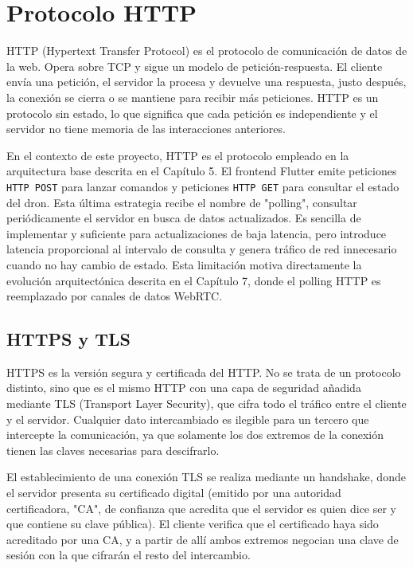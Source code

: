 \section{Protocolo HTTP}
HTTP (Hypertext Transfer Protocol)\cite{http} es el protocolo de comunicación de datos de la web. Opera sobre TCP y sigue un modelo de petición-respuesta. El cliente envía una petición, el servidor la procesa y devuelve una respuesta, justo después, la conexión se cierra o se mantiene para recibir más peticiones. HTTP es un protocolo sin estado, lo que significa que cada petición es independiente y el servidor no tiene memoria de las interacciones anteriores.

En el contexto de este proyecto, HTTP es el protocolo empleado en la arquitectura base descrita en el Capítulo 5. El frontend Flutter emite peticiones \texttt{HTTP POST} para lanzar comandos y peticiones \texttt{HTTP GET} para consultar el estado del dron. Esta última estrategia recibe el nombre de "polling", consultar periódicamente el servidor en busca de datos actualizados. Es sencilla de implementar y suficiente para actualizaciones de baja latencia, pero introduce latencia proporcional al intervalo de consulta y genera tráfico de red innecesario cuando no hay cambio de estado. Esta limitación motiva directamente la evolución arquitectónica descrita en el Capítulo 7, donde el polling HTTP es reemplazado por canales de datos WebRTC.

\subsection{HTTPS y TLS}
HTTPS es la versión segura y certificada del HTTP. No se trata de un protocolo distinto, sino que es el mismo HTTP con una capa de seguridad añadida mediante TLS (Transport Layer Security)\cite{tls}, que cifra todo el tráfico entre el cliente y el servidor. Cualquier dato intercambiado es ilegible para un tercero que intercepte la comunicación, ya que solamente los dos extremos de la conexión tienen las claves necesarias para descifrarlo.

El establecimiento de una conexión TLS se realiza mediante un handshake, donde el servidor presenta su certificado digital (emitido por una autoridad certificadora, "CA", de confianza que acredita que el servidor es quien dice ser y que contiene su clave pública). El cliente verifica que el certificado haya sido acreditado por una CA, y a partir de allí ambos extremos negocian una clave de sesión con la que cifrarán el resto del intercambio. 

